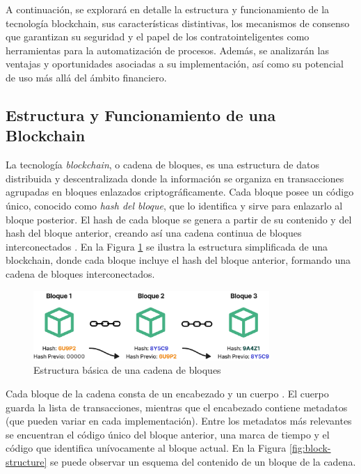 A continuación, se explorará en detalle la estructura y funcionamiento de la tecnología blockchain, sus características distintivas, los mecanismos de consenso que garantizan su seguridad y el papel de los \glspl{contratointeligente} como herramientas para la automatización de procesos. Además, se analizarán las ventajas y oportunidades asociadas a su implementación, así como su potencial de uso más allá del ámbito financiero.

\subsection{Estructura y Funcionamiento de una Blockchain}

La tecnología \textit{\gls{blockchain}}, o cadena de bloques, es una estructura de datos distribuida y descentralizada donde la información se organiza en transacciones agrupadas en bloques enlazados criptográficamente. Cada bloque posee un código único, conocido como \textit{\gls{hash} del bloque}, que lo identifica y sirve para enlazarlo al bloque posterior. El hash de cada bloque se genera a partir de su contenido y del hash del bloque anterior, creando así una cadena continua de bloques interconectados \cite{tripathi2023comprehensive}. En la Figura \ref{fig:blockchain-basic} se ilustra la estructura simplificada de una blockchain, donde cada bloque incluye el hash del bloque anterior, formando una cadena de bloques interconectados.

\begin{figure}[!ht]
    \centering
    \includegraphics[width=0.8\textwidth]{Figures/blockchain-basic.png}
    \caption{Estructura básica de una cadena de bloques}
    \label{fig:blockchain-basic}
\end{figure}

Cada bloque de la cadena consta de un encabezado y un cuerpo \cite{tripathi2023comprehensive}. El cuerpo guarda la lista de transacciones, mientras que el encabezado contiene metadatos (que pueden variar en cada implementación). Entre los metadatos más relevantes se encuentran el código único del bloque anterior, una marca de tiempo y el código que identifica unívocamente al bloque actual. En la Figura \ref{fig:block-structure} se puede observar un esquema del contenido de un bloque de la cadena.

